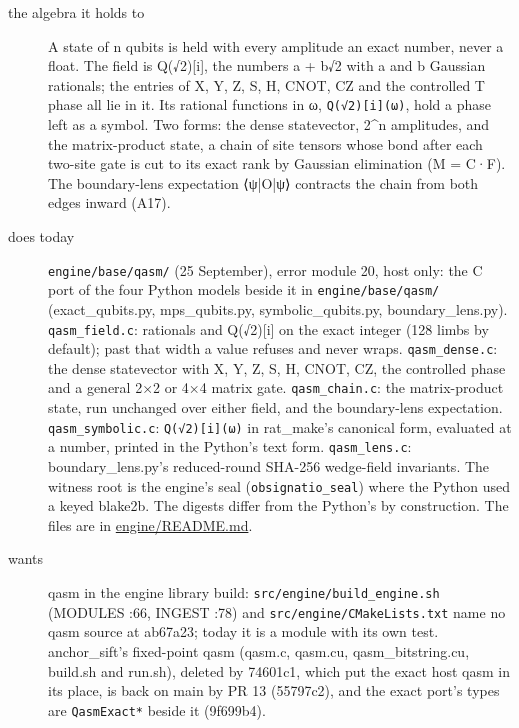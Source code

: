 \begin{description}
\item[{the algebra it holds to}] A state of n qubits is held with every amplitude an exact number, never a float. The field is Q(√2)[i], the numbers a + b√2 with a and b Gaussian rationals; the entries of X, Y, Z, S, H, CNOT, CZ and the controlled T phase all lie in it. Its rational functions in ω, \texttt{Q(√2)[i](ω)}, hold a phase left as a symbol. Two forms: the dense statevector, 2\textasciicircum{}n amplitudes, and the matrix-product state, a chain of site tensors whose bond after each two-site gate is cut to its exact rank by Gaussian elimination (M = C·F). The boundary-lens expectation ⟨ψ|O|ψ⟩ contracts the chain from both edges inward (A17).
\item[{does today}] \texttt{engine/\allowbreak{}base/\allowbreak{}qasm/\allowbreak{}} (25 September), error module 20, host only: the C port of the four Python models beside it in \texttt{engine/\allowbreak{}base/\allowbreak{}qasm/\allowbreak{}} (exact\_\allowbreak{}qubits.py, mps\_\allowbreak{}qubits.py, symbolic\_\allowbreak{}qubits.py, boundary\_\allowbreak{}lens.py). \texttt{qasm\_\allowbreak{}field.\allowbreak{}c}: rationals and Q(√2)[i] on the exact integer (128 limbs by default); past that width a value refuses and never wraps. \texttt{qasm\_\allowbreak{}dense.\allowbreak{}c}: the dense statevector with X, Y, Z, S, H, CNOT, CZ, the controlled phase and a general 2×2 or 4×4 matrix gate. \texttt{qasm\_\allowbreak{}chain.\allowbreak{}c}: the matrix-product state, run unchanged over either field, and the boundary-lens expectation. \texttt{qasm\_\allowbreak{}symbolic.\allowbreak{}c}: \texttt{Q(√2)[i](ω)} in rat\_\allowbreak{}make's canonical form, evaluated at a number, printed in the Python's text form. \texttt{qasm\_\allowbreak{}lens.\allowbreak{}c}: boundary\_\allowbreak{}lens.py's reduced-round SHA-256 wedge-field invariants. The witness root is the engine's seal (\texttt{obsignatio\_\allowbreak{}seal}) where the Python used a keyed blake2b. The digests differ from the Python's by construction. The files are in \href{https://github.com/dstroy0/cell_tracking/blob/main/engine/README.md}{engine/README.md}.
\item[{wants}] qasm in the engine library build: \texttt{src/\allowbreak{}engine/\allowbreak{}build\_\allowbreak{}engine.\allowbreak{}sh} (MODULES :66, INGEST :78) and \texttt{src/\allowbreak{}engine/\allowbreak{}CMakeLists.\allowbreak{}txt} name no qasm source at ab67a23; today it is a module with its own test. anchor\_\allowbreak{}sift's fixed-point qasm (qasm.c, qasm.cu, qasm\_\allowbreak{}bitstring.cu, build.sh and run.sh), deleted by 74601c1, which put the exact host qasm in its place, is back on main by PR 13 (55797c2), and the exact port's types are \texttt{Qasm\allowbreak{}Exact*} beside it (9f699b4).

\end{description}
